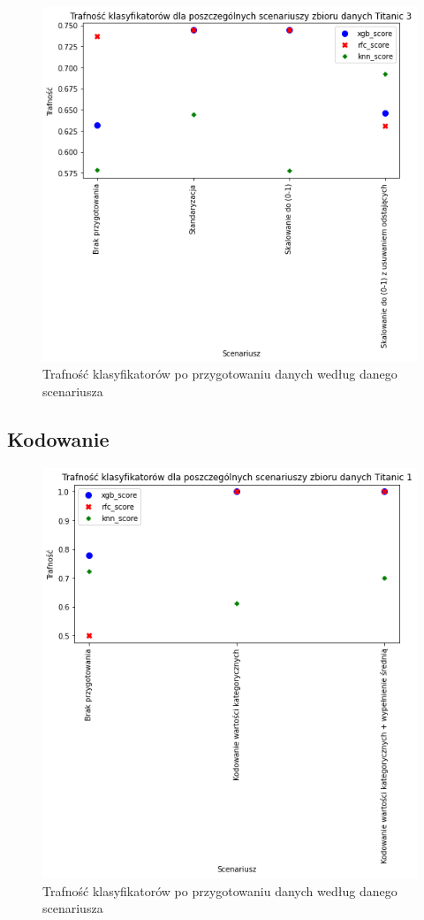 \documentclass{book}
\begin{document}
\begin{figure}[H]
\centerline{\includegraphics{Titanic_3_Standaryzacja}}
\centering
\caption{Trafność klasyfikatorów po przygotowaniu danych 
według danego scenariusza}
\end{figure}

\subsection{Kodowanie}


\begin{figure}[H]
\centerline{\includegraphics{Titanic_1_Kodowanie}}
\centering
\caption{Trafność klasyfikatorów po przygotowaniu danych 
według danego scenariusza}
\end{figure}
\end{document}
